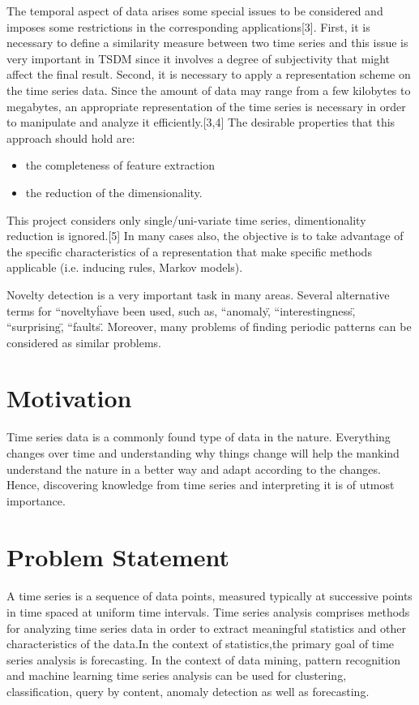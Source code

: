 \documentclass[12pt,a4paper]{report}
\begin{document}
  The temporal aspect of data arises some special issues to be considered and imposes some restrictions in the corresponding applications[3]. First, it is necessary to define a similarity measure between two time series and this issue is very important in TSDM since it involves a degree of subjectivity that might affect the final result. Second, it is necessary to apply a representation scheme on the time series data. Since the amount of data may range from a few kilobytes to megabytes, an appropriate representation of the time series is necessary in order to manipulate and analyze it efficiently.[3,4] The desirable properties that this approach should hold are: 
  \begin{itemize}
  \item the completeness of feature extraction 
  \item the reduction of the dimensionality. 
  \end{itemize}

This project  considers only single/uni-variate time series, dimentionality reduction is ignored.[5]
In many cases also, the objective is to take advantage of the specific characteristics of a representation that make specific methods applicable (i.e. inducing rules, Markov models). 

Novelty detection is a very important task in many areas. Several alternative terms for ``novelty\" have been used, such as, ``anomaly\", ``interestingness\", ``surprising\", ``faults\". Moreover, many problems of finding periodic patterns can be considered as similar problems.

\section{Motivation}
Time series data is a commonly found type of data in the nature. Everything changes over time and understanding why things change will help the mankind understand the nature in a better way and adapt according to the changes. Hence, discovering knowledge from time series and interpreting it is of utmost importance.

\section{Problem Statement}
\paragraph{} A time series is a sequence of data points, measured typically at successive points in time spaced at uniform time intervals. Time series analysis comprises methods for analyzing time series data in order to extract meaningful statistics and other characteristics of the data.In the context of statistics,the primary goal of time series analysis is forecasting. In the context of data mining, pattern recognition and machine learning time series analysis can be used for clustering, classification, query by content, anomaly detection as well as forecasting.
\end{document}
